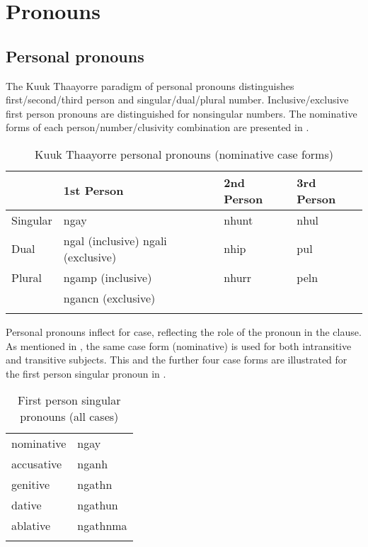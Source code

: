 \documentclass[output=paper]{langscibook}
\begin{document}
\section{Pronouns}\label{sec:Gaby:2}

\subsection{Personal pronouns}\label{sec:Gaby:2.1}

The Kuuk Thaayorre paradigm of personal pronouns distinguishes first/second/third person and singular/dual/plural number. Inclusive/exclusive first person pronouns are distinguished for nonsingular numbers. The nominative forms of each person/number/clusivity combination are presented in .

\begin{table}
\begin{tabularx}{0.78\textwidth}{p{1.2cm}p{3cm}p{2cm}p{2cm}} 
\lsptoprule
& {1st} {Person} & {2nd} {Person} & {3rd} {Person}\\
\hline
{Singular} & {ngay} & {nhunt} & {nhul}\\
{Dual} & {ngal} (inclusive) {ngali} (exclusive) & {nhip} & {pul}\\
{Plural} & {ngamp} (inclusive) & {nhurr} & {peln}\\
& {ngancn} (exclusive) &  & \\
\lspbottomrule
\end{tabularx}
\caption{Kuuk Thaayorre personal pronouns (nominative case forms)}\label{tab:Gaby:1}
\end{table}

Personal pronouns inflect for case, reflecting the role of the pronoun in the clause. As mentioned in , the same case form (nominative) is used for both intransitive and transitive subjects. This and the further four case forms are illustrated for the first person singular pronoun in .

\begin{table}
\begin{tabularx}{0.5\textwidth}{XX}
\lsptoprule
nominative & {ngay}\\
accusative & {nganh}\\
genitive & {ngathn}\\
dative & {ngathun}\\
ablative & {ngathnma}\\
\lspbottomrule
\end{tabularx}
\caption{First person singular pronouns (all cases)}\label{tab:Gaby:2}
\end{table}
\end{document}
